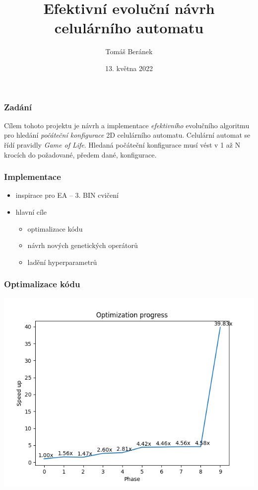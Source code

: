 \documentclass[10pt,xcolor=pdflatex,hyperref={unicode}]{beamer}
\title{Efektivní evoluční návrh \\celulárního automatu}
\author[]{
Tomáš Beránek\\
}
\institute[]{xberan46@stud.fit.vutbr.cz\\
Fakulta informačních technologií Vysokého učení technického v Brně\\
}
\date{13. května 2022}
\begin{document}
\frame[plain]{\titlepage}

\begin{frame}
\frametitle{Zadání}
Cílem tohoto projektu je návrh a implementace \emph{efektivního} evolučního algoritmu pro hledání \emph{počáteční konfigurace} 2D celulárního automatu. Celulární automat se řídí pravidly \emph{Game of Life}. Hledaná počáteční konfigurace musí vést v 1 až N krocích do požadované, předem dané, konfigurace.
\end{frame}

\begin{frame}
\frametitle{Implementace}
\doublespacing
\begin{itemize}
    \item inspirace pro EA -- 3. BIN cvičení
    \item hlavní cíle
        \begin{itemize}
            \item optimalizace kódu
            \item návrh nových genetických operátorů
            \item ladění hyperparametrů
        \end{itemize}
\end{itemize}
\end{frame}

\begin{frame}
\frametitle{Optimalizace kódu}
    \includegraphics[width=0.8\paperwidth]{img/optimization_progress.png}
\end{frame}
\end{document}
